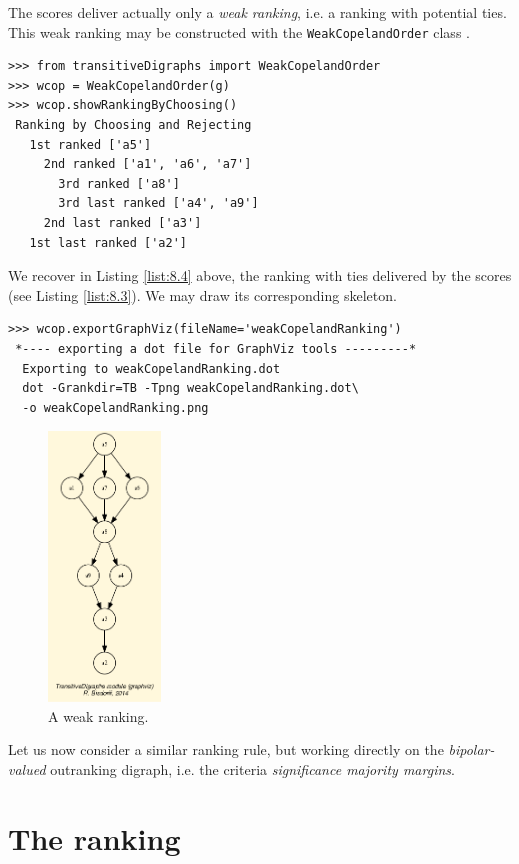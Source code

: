 The \Copeland scores deliver actually only a \emph{weak ranking}, i.e. a ranking with potential ties. This weak ranking may be constructed with the \texttt{WeakCopelandOrder} class .
\begin{lstlisting}[caption={Checking the quality of the \Copeland Ranking},label=list:8.4]
>>> from transitiveDigraphs import WeakCopelandOrder
>>> wcop = WeakCopelandOrder(g)
>>> wcop.showRankingByChoosing()
 Ranking by Choosing and Rejecting
   1st ranked ['a5']
     2nd ranked ['a1', 'a6', 'a7']
       3rd ranked ['a8']
       3rd last ranked ['a4', 'a9']
     2nd last ranked ['a3']
   1st last ranked ['a2']
\end{lstlisting}
We recover in Listing \ref{list:8.4} above, the ranking with ties delivered by the \Copeland scores (see Listing \ref{list:8.3}). We may draw its corresponding skeleton.
\begin{lstlisting}
>>> wcop.exportGraphViz(fileName='weakCopelandRanking')
 *---- exporting a dot file for GraphViz tools ---------*
  Exporting to weakCopelandRanking.dot
  dot -Grankdir=TB -Tpng weakCopelandRanking.dot\
  -o weakCopelandRanking.png
\end{lstlisting}
\begin{figure}[h]
\sidecaption[t]
\includegraphics[width=3cm]{Figures/weakCopelandRanking.png}
\caption{A weak \Copeland ranking.}
\label{fig:8.2}       %
\end{figure}

Let us now consider a similar ranking rule, but working directly on the \emph{bipolar-valued} outranking digraph, i.e. the criteria \emph{significance majority margins}.

\section{The \NetFlows ranking}
\label{sec:8.3}

